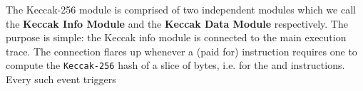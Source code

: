 The Keccak-256 module is comprised of two independent modules which we call the \textbf{Keccak Info Module} and the \textbf{Keccak Data Module} respectively. The purpose is simple: the Keccak info module is connected to the main execution trace. The connection flares up whenever a (paid for) instruction requires one to compute the \texttt{Keccak-256} hash of a slice of bytes, i.e. for the  and  instructions. Every such event triggers